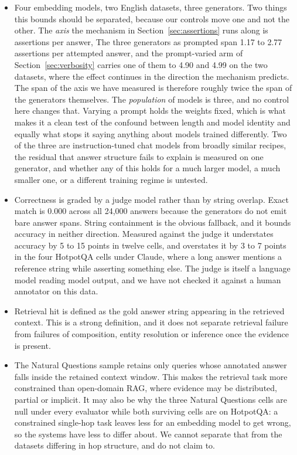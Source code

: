 \documentclass[11pt]{article}
\begin{document}
\begin{itemize}
\item Four embedding models, two English datasets, three generators. Two things this bounds should be separated, because our controls move one and not the other. The \emph{axis} the mechanism in Section~\ref{sec:assertions} runs along is assertions per answer, The three generators as prompted span 1.17 to 2.77 assertions per attempted answer, and the prompt-varied arm of Section~\ref{sec:verbosity} carries one of them to 4.90 and 4.99 on the two datasets, where the effect continues in the direction the mechanism predicts. The span of the axis we have measured is therefore roughly twice the span of the generators themselves. The \emph{population} of models is three, and no control here changes that. Varying a prompt holds the weights fixed, which is what makes it a clean test of the confound between length and model identity and equally what stops it saying anything about models trained differently. Two of the three are instruction-tuned chat models from broadly similar recipes, the residual that answer structure fails to explain is measured on one generator, and whether any of this holds for a much larger model, a much smaller one, or a different training regime is untested.
\item Correctness is graded by a judge model rather than by string overlap. Exact match is 0.000 across all 24,000 answers because the generators do not emit bare answer spans. String containment is the obvious fallback, and it bounds accuracy in neither direction. Measured against the judge it understates accuracy by 5 to 15 points in twelve cells, and overstates it by 3 to 7 points in the four HotpotQA cells under Claude, where a long answer mentions a reference string while asserting something else. The judge is itself a language model reading model output, and we have not checked it against a human annotator on this data.
\item Retrieval hit is defined as the gold answer string appearing in the retrieved context. This is a strong definition, and it does not separate retrieval failure from failures of composition, entity resolution or inference once the evidence is present.
\item The Natural Questions sample retains only queries whose annotated answer falls inside the retained context window. This makes the retrieval task more constrained than open-domain RAG, where evidence may be distributed, partial or implicit. It may also be why the three Natural Questions cells are null under every evaluator while both surviving cells are on HotpotQA: a constrained single-hop task leaves less for an embedding model to get wrong, so the systems have less to differ about. We cannot separate that from the datasets differing in hop structure, and do not claim to.

\end{itemize}
\end{document}
